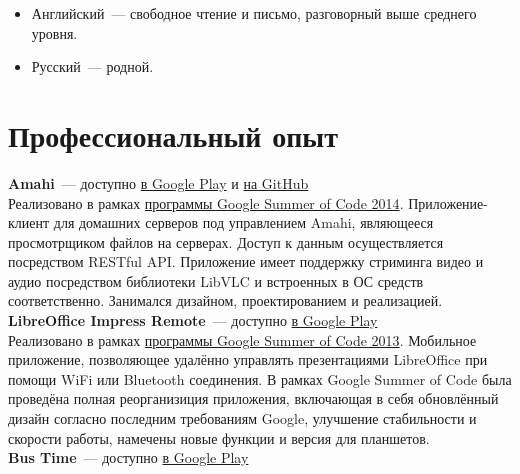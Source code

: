     \begin{itemize}

      \item Английский~--- свободное чтение и письмо, разговорный выше среднего уровня.

      \item Русский~--- родной.

    \end{itemize}


  \section*{Профессиональный опыт}

      \textbf{Amahi}~--- доступно \href{https://play.google.com/store/apps/details?id=org.amahi.anywhere}{в Google Play}
        и \href{https://github.com/amahi/android}{на GitHub} \\

        Реализовано в рамках \href{https://developers.google.com/open-source/soc}{программы Google Summer of Code 2014}.
        Приложение-клиент для домашних серверов под управлением Amahi, являющееся
        просмотрщиком файлов на серверах. Доступ к данным осуществляется
        посредством RESTful API. Приложение имеет поддержку стриминга
        видео и аудио посредством библиотеки LibVLC и встроенных в ОС
        средств соответственно. Занимался дизайном, проектированием и реализацией. \\

      \textbf{LibreOffice Impress Remote}~--- доступно \href{https://play.google.com/store/apps/details?id=org.libreoffice.impressremote}{в Google Play} \\

        Реализовано в рамках \href{https://developers.google.com/open-source/soc}{программы Google Summer of Code 2013}.
        Мобильное приложение, позволяющее удалённо управлять презентациями
        LibreOffice при помощи WiFi или Bluetooth соединения. В рамках
        Google Summer of Code была проведёна полная реорганизиция приложения,
        включающая в себя обновлённый дизайн согласно последним требованиям
        Google, улучшение стабильности и скорости работы, намечены новые
        функции и версия для планшетов. \\

      \textbf{Bus Time}~--- доступно \href{https://play.google.com/store/apps/details?id=ru.ming13.bustime}{в Google Play} \\

